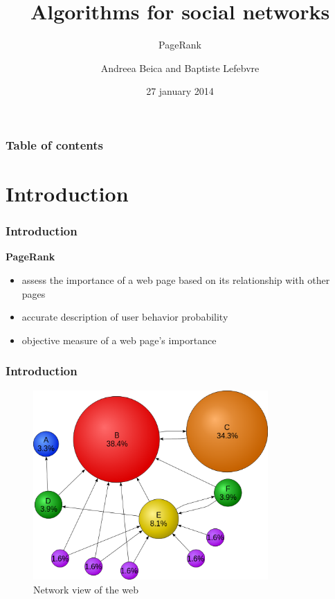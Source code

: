 \documentclass[10pt]{beamer}
\begin{document}
  
  \title{Algorithms for social networks}
  \subtitle{PageRank}
  \author{Andreea Beica and Baptiste Lefebvre}
  \date{27 january 2014}
  \maketitle

  
\begin{frame}
  \frametitle{Table of contents}
  \tableofcontents
\end{frame}


\section{Introduction}

\begin{frame}
\frametitle{Introduction}
\textbf{PageRank} 
\begin{itemize}
\item assess the importance of a web page based on its relationship with other pages
\item accurate description of user behavior probability
\item objective measure of a web page's importance
\end{itemize}
\end{frame}

\begin{frame}
\frametitle{Introduction}
\begin{figure}[h]
\includegraphics[width=0.8\textwidth]{500px-PageRanks-Example-svg.png}
\caption{Network view of the web}
\end{figure}
\end{frame}
\end{document}
